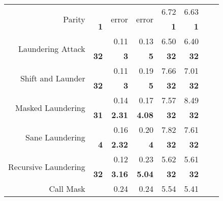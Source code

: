 \begin{table}[]
\begin{tabular}{rr|rr|rr|rr}
\multirow{2}{*}{Parity}               &               & \multirow{2}{*}{error} & \multirow{2}{*}{error} & 6.72          & 6.63         &                &               \\
                                      & \textbf{1}    &                        &                        & \textbf{1}    & \textbf{1}   &                &               \\ \hline
\multirow{2}{*}{Laundering Attack}    &               & 0.11                   & 0.13                   & 6.50          & 6.40         &                &               \\
                                      & \textbf{32}   & \textbf{3}             & \textbf{5}             & \textbf{32}   & \textbf{32}  &                &               \\ \hline
\multirow{2}{*}{Shift and Launder}    &               & 0.11                   & 0.19                   & 7.66          & 7.01         &                &               \\
                                      & \textbf{32}   & \textbf{3}             & \textbf{5}             & \textbf{32}   & \textbf{32}  &                &               \\ \hline
\multirow{2}{*}{Masked Laundering}    &               & 0.14                   & 0.17                   & 7.57          & 8.49         &                &               \\
                                      & \textbf{31}   & \textbf{2.31}          & \textbf{4.08}          & \textbf{32}   & \textbf{32}  &                &               \\ \hline
\multirow{2}{*}{Sane Laundering}      &               & 0.16                   & 0.20                   & 7.82          & 7.61         &                &               \\
                                      & \textbf{4}    & \textbf{2.32}          & \textbf{4}             & \textbf{32}   & \textbf{32}  &                &               \\ \hline
\multirow{2}{*}{Recursive Laundering} &               & 0.12                   & 0.23                   & 5.62          & 5.61         &                &               \\
                                      & \textbf{32}   & \textbf{3.16}          & \textbf{5.04}          & \textbf{32}   & \textbf{32}  &                &               \\ \hline
\multirow{2}{*}{Call Mask}            &               & 0.24                   & 0.24                   & 5.54          & 5.41         &                &               \\

\end{tabular}
\end{table}
